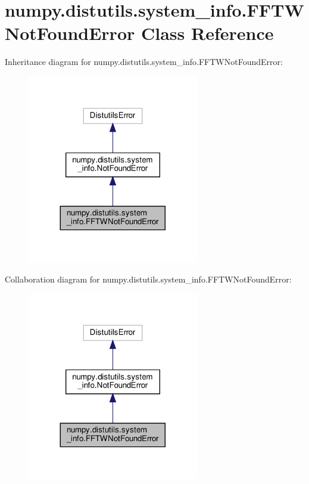 \hypertarget{classnumpy_1_1distutils_1_1system__info_1_1FFTWNotFoundError}{}\section{numpy.\+distutils.\+system\+\_\+info.\+F\+F\+T\+W\+Not\+Found\+Error Class Reference}
\label{classnumpy_1_1distutils_1_1system__info_1_1FFTWNotFoundError}


Inheritance diagram for numpy.\+distutils.\+system\+\_\+info.\+F\+F\+T\+W\+Not\+Found\+Error\+:
\nopagebreak
\begin{figure}[H]
\begin{center}
\leavevmode
\includegraphics[width=212pt]{classnumpy_1_1distutils_1_1system__info_1_1FFTWNotFoundError__inherit__graph}
\end{center}
\end{figure}


Collaboration diagram for numpy.\+distutils.\+system\+\_\+info.\+F\+F\+T\+W\+Not\+Found\+Error\+:
\nopagebreak
\begin{figure}[H]
\begin{center}
\leavevmode
\includegraphics[width=212pt]{classnumpy_1_1distutils_1_1system__info_1_1FFTWNotFoundError__coll__graph}
\end{center}
\end{figure}


